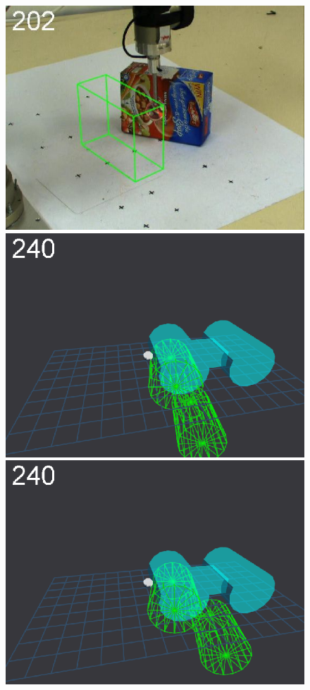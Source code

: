 \begin{figure}[tbp]
{\includegraphics[width=\imgCXwid]{images/C1_LWPR1_87_4}
\includegraphics[width=\imgCXwid]{images/C5_1exp_6_4}
\includegraphics[width=\imgCXwid]{images/C5_2exp_6_4}
}
\end{figure}
